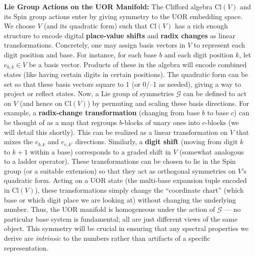 \documentclass{article}
\begin{document}
\medskip

\textbf{Lie Group Actions on the UOR Manifold:} The Clifford algebra $\mathrm{Cl}(V)$ and its Spin group actions enter by giving symmetry to the UOR embedding space. We choose $V$ (and its quadratic form) such that $\mathrm{Cl}(V)$ has a rich enough structure to encode digital \textbf{place-value shifts} and \textbf{radix changes} as linear transformations. Concretely, one may assign basis vectors in $V$ to represent each digit position and base. For instance, for each base $b$ and each digit position $k$, let $e_{b,k}\in V$ be a basis vector. Products of these in the algebra will encode combined states (like having certain digits in certain positions). The quadratic form can be set so that these basis vectors square to 1 (or 0/--1 as needed), giving a way to project or reflect states. Now, a Lie group of symmetries $\mathcal{G}$ can be defined to act on $V$ (and hence on $\mathrm{Cl}(V)$) by permuting and scaling these basis directions. For example, a \textbf{radix-change transformation} (changing from base $b$ to base $c$) can be thought of as a map that regroups $b$-blocks of unary ones into $c$-blocks (we will detail this shortly). This can be realized as a linear transformation on $V$ that mixes the $e_{b,k}$ and $e_{c,k'}$ directions. Similarly, a \textbf{digit shift} (moving from digit $k$ to $k+1$ within a base) corresponds to a graded shift in $V$ (somewhat analogous to a ladder operator). These transformations can be chosen to lie in the Spin group (or a suitable extension) so that they act as orthogonal symmetries on $V$’s quadratic form. Acting on a UOR state (the multi-base expansion tuple encoded in $\mathrm{Cl}(V)$), these transformations simply change the “coordinate chart” (which base or which digit place we are looking at) without changing the underlying number. Thus, the UOR manifold is homogeneous under the action of $\mathcal{G}$ --- no particular base system is fundamental; all are just different views of the same object. This symmetry will be crucial in ensuring that any spectral properties we derive are \emph{intrinsic} to the numbers rather than artifacts of a specific representation.

\medskip
\end{document}
